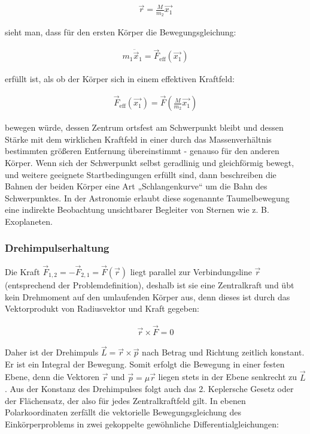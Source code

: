 \documentclass[a4paper,12pt,twoside]{article}
\begin{document}
\begin{align*}
	\vec{r} = \frac{M}{m_2} \vec{x_1}
\end{align*}

sieht man, dass für den ersten Körper die Bewegungsgleichung:

\begin{align*}
	m_1 \ddot{\vec{x}}_1 = \vec{F}_{\text{eff}}(\vec{x_1})
\end{align*}

erfüllt ist, als ob der Körper sich in einem effektiven Kraftfeld:

\begin{align*}
	\vec{F}_{\text{eff}}(\vec{x_1}) = \vec{F} \left( \frac{M}{m_2} \vec{x_1} \right)
\end{align*}

bewegen würde, dessen Zentrum ortsfest am Schwerpunkt bleibt und dessen Stärke mit dem wirklichen Kraftfeld in einer durch das Massenverhältnis bestimmten größeren Entfernung übereinstimmt - genauso für den anderen Körper.
Wenn sich der Schwerpunkt selbst geradlinig und gleichförmig bewegt, und weitere geeignete Startbedingungen erfüllt sind, dann beschreiben die Bahnen der beiden Körper eine Art „Schlangenkurve“ um die Bahn des Schwerpunktes. In der Astronomie erlaubt diese sogenannte Taumelbewegung eine indirekte Beobachtung unsichtbarer Begleiter von Sternen wie z. B. Exoplaneten.

\subsubsection{Drehimpulserhaltung}
Die Kraft \( \vec{F}_{1,2} = -\vec{F}_{2,1} = \vec{F}(\vec{r}) \) liegt parallel zur Verbindungsline \( \vec{r} \) (entsprechend der Problemdefinition), deshalb ist sie eine Zentralkraft und übt kein Drehmoment auf den umlaufenden Körper aus, denn dieses ist durch das Vektorprodukt von Radiusvektor und Kraft gegeben:

\begin{align*}
	\vec{r} \times \vec{F} = 0
\end{align*}

Daher ist der Drehimpuls \( \vec{L} = \vec{r} \times \vec{p} \) nach Betrag und Richtung zeitlich konstant. Er ist ein Integral der Bewegung. Somit erfolgt die Bewegung in einer festen Ebene, denn die Vektoren \( \vec{r} \) und \( \vec{p} = \mu \vec{r} \) liegen stets in der Ebene senkrecht zu \( \vec{L} \).
Aus der Konstanz des Drehimpulses folgt auch das 2. Keplersche Gesetz oder der Flächensatz, der also für jedes Zentralkraftfeld gilt.
In ebenen Polarkoordinaten zerfällt die vektorielle Bewegungsgleichung des Einkörperproblems in zwei gekoppelte gewöhnliche Differentialgleichungen:
\end{document}
